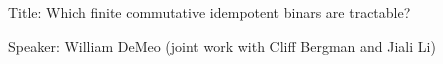 Title: Which finite commutative idempotent binars are tractable?

Speaker: William DeMeo (joint work with Cliff Bergman and Jiali Li)

